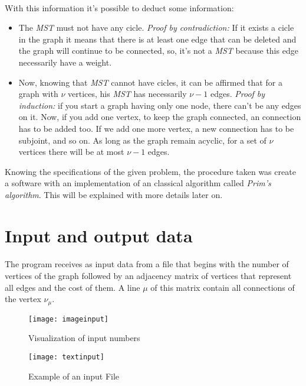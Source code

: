 \documentclass[titlepage]{article}
\begin{document}
    \paragraph{}
        With this information it's possible to deduct some information:
        \begin{itemize}
            \item The \emph{MST} must not have any cicle. \emph{Proof by contradiction:} If it exists a cicle in the graph it means that there is at least one edge that can be deleted and the graph will continue to be connected, so, it's not a \emph{MST} because this edge necessarily have a weight.
            \item  Now, knowing that \emph{MST} cannot have cicles, it can be affirmed that for a graph with \(\nu\) vertices, his \emph{MST} has necessarily \(\nu-1\) edges. \emph{Proof by induction:} if you start a graph having only one node, there can't be any edges on it. Now, if you add one vertex, to keep the graph connected, an connection has to be added too. If we add one more vertex, a new connection has to be subjoint, and so on. As long as the graph remain acyclic, for a set of \(\nu\) vertices there will be at most \(\nu-1\) edges. 
        \end{itemize} 
        Knowing the specifications of the given problem, the procedure taken was create a software with an implementation of an classical algorithm called \emph{Prim's algorithm}. This will be explained with more details later on.
        
    \section{Input and output data}
    \paragraph{}
        The program receives as input data from a file that begins with the number of vertices of the graph followed by an adjacency matrix of vertices that represent all edges and the cost of them. A line $\mu$ of this matrix contain all connections of the vertex $\nu_\mu$.
        \begin{figure}[h]
            \begin{center}
                \texttt{[image: imageinput]}
                \caption{Visualization of input numbers}
            \end{center}
        \end{figure}
        \begin{figure}[h]
            \begin{center}
                \texttt{[image: textinput]}
                \caption{Example of an input File}
            \end{center}
        \end{figure}
\end{document}
